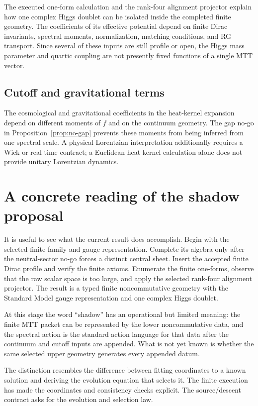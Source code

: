 \documentclass[11pt]{article}
\begin{document}
The executed one-form calculation and the rank-four alignment projector explain
how one complex Higgs doublet can be isolated inside the completed finite
geometry.  The coefficients of its effective potential depend on finite Dirac
invariants, spectral moments, normalization, matching conditions, and RG
transport.  Since several of these inputs are still profile or open, the Higgs
mass parameter and quartic coupling are not presently fixed functions of a
single MTT vector.

\subsection{Cutoff and gravitational terms}

The cosmological and gravitational coefficients in the heat-kernel expansion
depend on different moments of $f$ and on the continuum geometry.  The gap
no-go in Proposition~\ref{prop:no-gap} prevents these moments from being inferred from one
spectral scale.  A physical Lorentzian interpretation additionally requires a
Wick or real-time contract; a Euclidean heat-kernel calculation alone does not
provide unitary Lorentzian dynamics.

\section{A concrete reading of the shadow proposal}

It is useful to see what the current result does accomplish.  Begin with the
selected finite family and gauge representation.  Complete its algebra only
after the neutral-sector no-go forces a distinct central sheet.  Insert the
accepted finite Dirac profile and verify the finite axioms.  Enumerate the
finite one-forms, observe that the raw scalar space is too large, and apply the
selected rank-four alignment projector.  The result is a typed finite
noncommutative geometry with the Standard Model gauge representation and one
complex Higgs doublet.

At this stage the word ``shadow'' has an operational but limited meaning: the
finite MTT packet can be represented by the lower noncommutative data, and the
spectral action is the standard action language for that data after the
continuum and cutoff inputs are appended.  What is not yet known is whether
the same selected upper geometry generates every appended datum.

The distinction resembles the difference between fitting coordinates to a
known solution and deriving the evolution equation that selects it.  The
finite execution has made the coordinates and consistency checks explicit.
The source/descent contract asks for the evolution and selection law.
\end{document}
